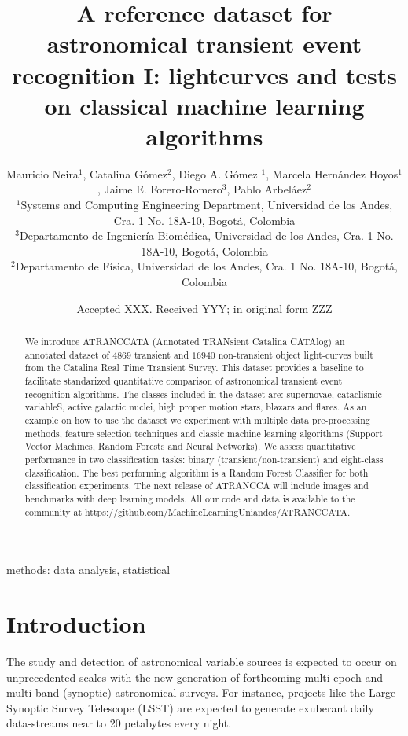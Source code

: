 \documentclass[a4paper,fleqn,usenatbib]{mnras}
\title[A reference transient dataset I: lightcurves]{A reference
  dataset for astronomical transient event recognition I: lightcurves
  and tests on classical machine learning algorithms}
\author[M. Neira et al.]
{Mauricio Neira$^{1}$, Catalina G\'omez$^{2}$, Diego A. G\'omez $^{1}$,
Marcela Hern\'andez Hoyos$^{1}$,   
\newauthor
Jaime E. Forero-Romero$^{3}$,
Pablo Arbel\'aez$^{2}$
\\
$^{1}$Systems and Computing Engineering Department, Universidad de los Andes, Cra. 1 No. 18A-10, Bogot\'a, Colombia\\
$^{3}$Departamento de Ingenier\'ia Biom\'edica, Universidad de los Andes, Cra. 1 No. 18A-10, Bogot\'a, Colombia\\
$^{2}$Departamento de F\'isica, Universidad de los Andes, Cra. 1 No. 18A-10, Bogot\'a, Colombia
}
\date{Accepted XXX. Received YYY; in original form ZZZ}
\begin{document}
\label{firstpage}
\pagerange{\pageref{firstpage}--\pageref{lastpage}}
\maketitle

\begin{abstract}

We introduce ATRANCCATA (Annotated TRANsient Catalina CATAlog) an
annotated dataset of $4869$ transient and $16940$ non-transient
object light-curves built from the Catalina Real Time Transient
Survey.  
This dataset provides a baseline to facilitate standarized
quantitative comparison of astronomical transient event recognition
algorithms.    
The classes included in the dataset are: supernovae, cataclismic
variableS, active galactic nuclei, high proper motion stars, blazars
and flares.
As an example on how to use the dataset we experiment with multiple
data pre-processing methods, feature selection techniques and classic
machine learning algorithms (Support Vector Machines, Random Forests
and Neural Networks).   
We assess quantitative performance in two classification tasks:
binary (transient/non-transient) and eight-class classification.   
The best performing algorithm is a Random Forest Classifier for both
classification experiments.  
The next release of ATRANCCA will include images and benchmarks with
deep learning models. 
All our code and data is available to the community at
\url{https://github.com/MachineLearningUniandes/ATRANCCATA}.
\end{abstract}

\begin{keywords}
methods: data analysis, statistical
\end{keywords}



\section{Introduction}

The study and detection of astronomical variable sources is expected
to occur on unprecedented scales with the new generation of
forthcoming multi-epoch and multi-band (synoptic) astronomical
surveys. 
For instance, projects like the Large Synoptic Survey Telescope
(LSST)  \citep{0805.2366,1512.07914} are expected to generate
exuberant daily data-streams near to 20 petabytes every night.   
\end{document}
